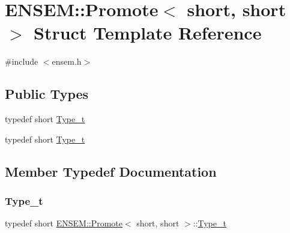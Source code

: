 \hypertarget{structENSEM_1_1Promote_3_01short_00_01short_01_4}{}\section{E\+N\+S\+EM\+:\+:Promote$<$ short, short $>$ Struct Template Reference}
\label{structENSEM_1_1Promote_3_01short_00_01short_01_4}


{\ttfamily \#include $<$ensem.\+h$>$}

\subsection*{Public Types}
\begin{DoxyCompactItemize}
\item 
typedef short \mbox{\hyperlink{structENSEM_1_1Promote_3_01short_00_01short_01_4_a6b4eee8b5b19e8dd07645327f1e73377}{Type\+\_\+t}}
\item 
typedef short \mbox{\hyperlink{structENSEM_1_1Promote_3_01short_00_01short_01_4_a6b4eee8b5b19e8dd07645327f1e73377}{Type\+\_\+t}}
\end{DoxyCompactItemize}


\subsection{Member Typedef Documentation}
\mbox{\label{structENSEM_1_1Promote_3_01short_00_01short_01_4_a6b4eee8b5b19e8dd07645327f1e73377}} 
\subsubsection{\texorpdfstring{Type\_t}{Type\_t}\hspace{0.1cm}{\footnotesize\ttfamily [1/2]}}
{\footnotesize\ttfamily typedef short \mbox{\hyperlink{structENSEM_1_1Promote}{E\+N\+S\+E\+M\+::\+Promote}}$<$ short, short $>$\+::\mbox{\hyperlink{structENSEM_1_1Promote_3_01short_00_01short_01_4_a6b4eee8b5b19e8dd07645327f1e73377}{Type\+\_\+t}}}

\mbox{\label{structENSEM_1_1Promote_3_01short_00_01short_01_4_a6b4eee8b5b19e8dd07645327f1e73377}} 
